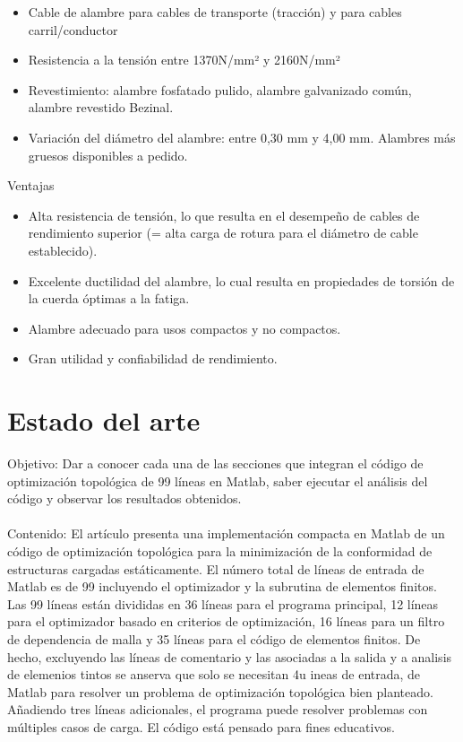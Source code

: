 \documentclass{article}
\begin{document}
\begin{itemize}
\item   Cable de alambre para cables de transporte (tracción) y para cables carril/conductor
\item   Resistencia a la tensión entre 1370N/mm² y 2160N/mm²
\item   Revestimiento: alambre fosfatado pulido, alambre galvanizado común, alambre revestido Bezinal.
\item   Variación del diámetro del alambre: entre 0,30 mm y 4,00 mm. Alambres más gruesos disponibles a pedido.

\end{itemize}

Ventajas
\begin{itemize}
\item   Alta resistencia de tensión, lo que resulta en el desempeño de cables de rendimiento superior (= alta carga de rotura para el diámetro de cable establecido).

\item   Excelente ductilidad del alambre, lo cual resulta en propiedades de torsión de la cuerda óptimas a la fatiga.

\item   Alambre adecuado para usos compactos y no compactos.

\item   Gran utilidad y confiabilidad de rendimiento.

\end{itemize}


\section{Estado del arte}
Objetivo: Dar a conocer cada una de las secciones que integran el código de optimización topológica de 99 líneas en Matlab, saber ejecutar el análisis del código y observar los resultados obtenidos.
\\
\\
Contenido: El artículo presenta una implementación compacta en Matlab de un código de optimización topológica para la minimización de la conformidad de estructuras cargadas estáticamente. El número total de líneas de entrada de Matlab es de 99 incluyendo el optimizador y la subrutina de elementos finitos. Las 99 líneas están divididas en 36 líneas para el programa principal, 12 líneas para el optimizador basado en criterios de optimización, 16 líneas para un filtro de dependencia de malla y 35 líneas para el código de elementos finitos. De hecho, excluyendo las líneas de comentario y las asociadas a la salida y a analisis de elemenios tintos se anserva que solo se necesitan 4u ineas de entrada, de Matlab para resolver un problema de optimización topológica bien planteado. Añadiendo tres líneas adicionales, el programa puede resolver problemas con múltiples casos de carga. El código está pensado para
fines educativos.
\end{document}
